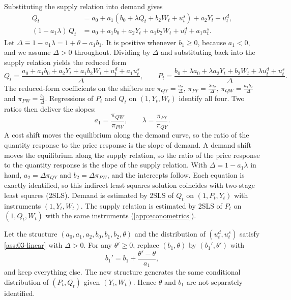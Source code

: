 Substituting the supply relation into demand gives
\begin{align*}
Q_t &= a_0 + a_1\left(b_0 + \lambda Q_t + b_2 W_t + u^s_t\right) + a_2 Y_t + u^d_t ,\\
(1 - a_1\lambda)\, Q_t &= a_0 + a_1 b_0 + a_2 Y_t + a_1 b_2 W_t + u^d_t + a_1 u^s_t .
\end{align*}
Let $\Delta \equiv 1 - a_1\lambda = 1 + \theta - a_1 b_1$. It is positive whenever $b_1 \ge 0$, because $a_1 < 0$, and we
assume $\Delta > 0$ throughout. Dividing by $\Delta$ and substituting back into the supply relation yields the reduced form
\begin{equation}\label{eq:03-linear-rf}
Q_t = \frac{a_0 + a_1 b_0 + a_2 Y_t + a_1 b_2 W_t + u^d_t + a_1 u^s_t}{\Delta}, \qquad
P_t = \frac{b_0 + \lambda a_0 + \lambda a_2 Y_t + b_2 W_t + \lambda u^d_t + u^s_t}{\Delta}.
\end{equation}
The reduced-form coefficients on the shifters are $\pi_{QY} = \frac{a_2}{\Delta}$, $\pi_{PY} = \frac{\lambda a_2}{\Delta}$,
$\pi_{QW} = \frac{a_1 b_2}{\Delta}$ and $\pi_{PW} = \frac{b_2}{\Delta}$. Regressions of $P_t$ and $Q_t$ on $(1, Y_t, W_t)$
identify all four. Two ratios then deliver the slopes:
\begin{equation*}
a_1 = \frac{\pi_{QW}}{\pi_{PW}}, \qquad \lambda = \frac{\pi_{PY}}{\pi_{QY}} .
\end{equation*}
A cost shift moves the equilibrium along the demand curve, so the ratio of the quantity response to the price response
is the slope of demand. A demand shift moves the equilibrium along the supply relation, so the ratio of the price
response to the quantity response is the slope of the supply relation. With $\Delta = 1 - a_1\lambda$ in hand,
$a_2 = \Delta\pi_{QY}$ and $b_2 = \Delta\pi_{PW}$, and the intercepts follow. Each equation is exactly identified, so this
indirect least squares solution coincides with two-stage least squares (2SLS). Demand is estimated by 2SLS of $Q_t$ on
$(1, P_t, Y_t)$ with instruments $(1, Y_t, W_t)$. The supply relation is estimated by 2SLS of $P_t$ on $(1, Q_t, W_t)$
with the same instruments (\cref{app:econometrics}).

\begin{proposition}\label{prop:03-obs-equiv}
Let the structure $(a_0, a_1, a_2, b_0, b_1, b_2, \theta)$ and the distribution of $(u^d_t, u^s_t)$ satisfy
\cref{ass:03-linear} with $\Delta > 0$. For any $\theta' \ge 0$, replace $(b_1, \theta)$ by $(b_1', \theta')$ with
\begin{equation*}
b_1' = b_1 + \frac{\theta' - \theta}{a_1},
\end{equation*}
and keep everything else. The new structure generates the same conditional distribution of $(P_t, Q_t)$ given
$(Y_t, W_t)$. Hence $\theta$ and $b_1$ are not separately identified.
\end{proposition}

